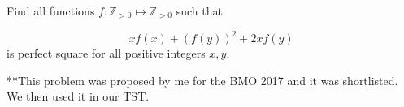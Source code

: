 Find all functions $f:\mathbb{Z}_{>0}\mapsto\mathbb{Z}_{>0}$ such that

$$xf(x)+(f(y))^2+2xf(y)$$is perfect square for all positive integers $x,y$.

**This problem was proposed by me for the BMO 2017 and it was shortlisted. We then used it in our TST.
